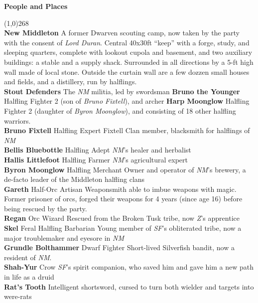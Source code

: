 \documentclass[letterpaper]{article}
\newcommand{\colline}{\line(1,0){268} \\}
\newcommand{\e}[1]{\emph{#1}}
\newcommand{\B}[1]{\textbf{#1}}
\newenvironment{notesection}[1]
{ {\huge \B{#1}} \par
\vspace{-0.75em}
\colline
\begingroup\fontsize{9pt}{12pt}\selectfont}
{\endgroup}
\newcommand{\person}[3]{\B{#1
    \ifstrequal{#2}{M}{{\color{ProcessBlue}\male}}{%
    \ifstrequal{#2}{F}{\color{VioletRed}\female}{}}}{\scriptsize #3}}
\begin{document}
\begin{notesection}{People and Places}
\B{New Middleton} A former Dwarven scouting camp, now taken by the party with the consent of \e{Lord Duran}.  Central 40x30ft ``keep'' with a forge, study, and sleeping quarters, complete with lookout cupola and basement, and two auxiliary buildings: a stable and a supply shack. Surrounded in all directions by a 5-ft high wall made of local stone. Outside the curtain wall are a few dozzen small houses and fields, and a distillery, run by halflings. \\
\B{Stout Defenders} The \e{NM} militia, led by swordsman \person{Bruno the Younger}{M}{Halfling Fighter 2} (son of \e{Bruno Fixtell}), and archer \person{Harp Moonglow}{F}{Halfling Fighter 2} (daughter of \e{Byron Moonglow}), and consisting of 18 other halfling warriors.\\
\person{Bruno Fixtell}{M}{Halfling Expert} Fixtell Clan member, blacksmith for halflings of \e{NM} \\
\person{Bellis Bluebottle}{F}{Halfling Adept} \e{NM}'s healer and herbalist \\
\person{Hallis Littlefoot}{F}{Halfling Farmer} \e{NM}'s agricultural expert \\
\person{Byron Moonglow}{M}{Halfling Merchant} Owner and operator of \e{NM}'s brewery, a de-facto leader of the Middleton halfling clans \\
\person{Gareth}{M}{Half-Orc Artisan} Weaponsmith able to imbue weapons with magic. Former prisoner of orcs, forged their weapons for 4 years (since age 16) before being rescued by the party. \\
\person{Regan}{M}{Orc Wizard} Rescued from the Broken Tusk tribe, now \e{Z}'s apprentice \\
\person{Skel}{M}{Feral Halfling Barbarian} Young member of \e{SF}'s obliterated tribe, now a major troublemaker and eyesore in \e{NM} \\
\person{Grundle Bolthammer}{F}{Dwarf Fighter} Short-lived Silverfish bandit, now a resident of \e{NM}.\\
\person{Shah-Yur}{M}{Crow} \e{SF}'s spirit companion, who saved him and gave him a new path in life as a druid\\
\B{Rat's Tooth} Intelligent shortsword, cursed to turn both wielder and targets into were-rats\\


\end{notesection}
\end{document}
